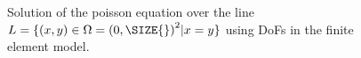 \begin{figure}[h]
    \centering
    \caption{Solution of the poisson equation over the line $L = \{(x, y)\in\Omega = {(0, \SIZE{})}^2 | x = y\}$ using \NUMDOFS{} DoFs in the finite element model.}%
    \label{fig:u}
\end{figure}

